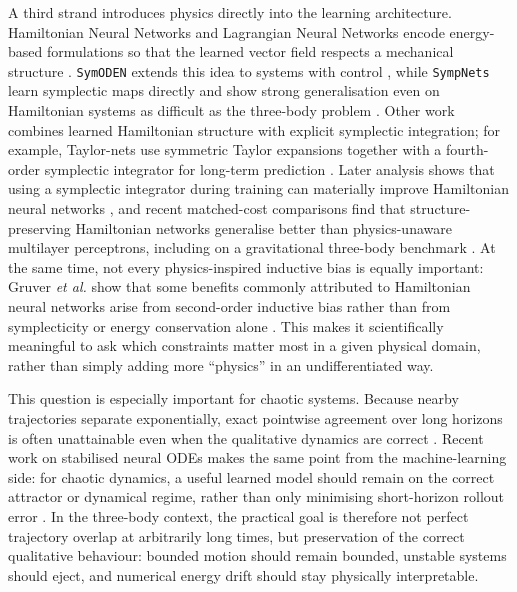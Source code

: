 \documentclass[12pt]{article}
\begin{document}
A third strand introduces physics directly into the learning architecture. Hamiltonian Neural Networks and Lagrangian Neural Networks encode energy-based formulations so that the learned vector field respects a mechanical structure \cite{greydanus2019hamiltonian,cranmer2020lagrangian}. \texttt{SymODEN} extends this idea to systems with control \cite{zhong2020symoden}, while \texttt{SympNets} learn symplectic maps directly and show strong generalisation even on Hamiltonian systems as difficult as the three-body problem \cite{jin2020sympnets}. Other work combines learned Hamiltonian structure with explicit symplectic integration; for example, Taylor-nets use symmetric Taylor expansions together with a fourth-order symplectic integrator for long-term prediction \cite{tong2021symplectic}. Later analysis shows that using a symplectic integrator during training can materially improve Hamiltonian neural networks \cite{david2023symplectic}, and recent matched-cost comparisons find that structure-preserving Hamiltonian networks generalise better than physics-unaware multilayer perceptrons, including on a gravitational three-body benchmark \cite{horn2025generalized}. At the same time, not every physics-inspired inductive bias is equally important: Gruver \emph{et al.} show that some benefits commonly attributed to Hamiltonian neural networks arise from second-order inductive bias rather than from symplecticity or energy conservation alone \cite{gruver2022deconstructing}. This makes it scientifically meaningful to ask which constraints matter most in a given physical domain, rather than simply adding more ``physics'' in an undifferentiated way.

This question is especially important for chaotic systems. Because nearby trajectories separate exponentially, exact pointwise agreement over long horizons is often unattainable even when the qualitative dynamics are correct \cite{margazoglou2023stability}. Recent work on stabilised neural ODEs makes the same point from the machine-learning side: for chaotic dynamics, a useful learned model should remain on the correct attractor or dynamical regime, rather than only minimising short-horizon rollout error \cite{linot2022stabilized}. In the three-body context, the practical goal is therefore not perfect trajectory overlap at arbitrarily long times, but preservation of the correct qualitative behaviour: bounded motion should remain bounded, unstable systems should eject, and numerical energy drift should stay physically interpretable.
\end{document}
